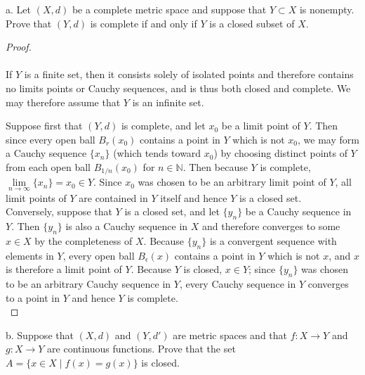 a.  Let $(X, d)$ be a complete metric space and suppose that $Y \subset X$ is nonempty. Prove that $(Y, d)$ is complete 
    if and only if $Y$ is a closed subset of $X$.

\begin{proof}\ \\\\
    If $Y$ is a finite set, then it consists solely of isolated points and therefore contains no limits points or Cauchy
    sequences, and is thus both closed and complete. We may therefore assume that $Y$ is an infinite set.

    Suppose first that $(Y, d)$ is complete, and let $x_0$ be a limit point of $Y$. Then since every open ball 
    $B_r(x_0)$ contains a point in $Y$ which is not $x_0$, we may form a Cauchy sequence $\{x_n\}$ (which tends toward
    $x_0$) by choosing distinct points of $Y$ from each open ball $B_{1/n}(x_0)$ for $n \in \mathbb{N}$. Then 
    because $Y$ is complete, $\lim\limits_{n \to \infty}{\{x_n\}} = x_0 \in Y$. Since $x_0$ was chosen to be an 
    arbitrary limit point of $Y$, all limit points of $Y$ are contained in $Y$ itself and hence $Y$ is a closed set.
    \ \\

    Conversely, suppose that $Y$ is a closed set, and let $\{y_n\}$ be a Cauchy sequence in $Y$. Then $\{y_n\}$ is also
    a Cauchy sequence in $X$ and therefore converges to some $x \in X$ by the completeness of $X$. Because $\{y_n\}$ is
    a convergent sequence with elements in $Y$, every open ball $B_{\epsilon}(x)$ contains a point in $Y$ which is not 
    $x$, and $x$ is therefore a limit point of $Y$. Because $Y$ is closed, $x \in Y$; since $\{y_n\}$ was chosen to be 
    an arbitrary Cauchy sequence in $Y$, every Cauchy sequence in $Y$ converges to a point in $Y$ and hence $Y$ is 
    complete.
    \ \\
\end{proof}

\pagebreak


b. Suppose that $(X, d)$ and $(Y, d')$ are metric spaces and that $f:X \to Y$ and $g:X \to Y$ are continuous functions.
   Prove that the set $A = \{ x \in X \mid f(x) = g(x)\}$ is closed.

